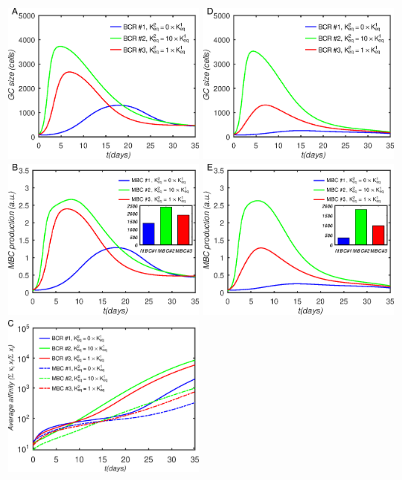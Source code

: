 \begin{figure}
\centering
\includegraphics[width=0.45\textwidth]{../figS11abc/gcsize.eps}
\includegraphics[width=0.45\textwidth]{../figS11def/gcsize.eps}
\includegraphics[width=0.45\textwidth]{../figS11abc/dmbc.eps}
\includegraphics[width=0.45\textwidth]{../figS11def/dmbc.eps}
\includegraphics[width=0.45\textwidth]{../figS11abc/A.eps}

\end{figure}
